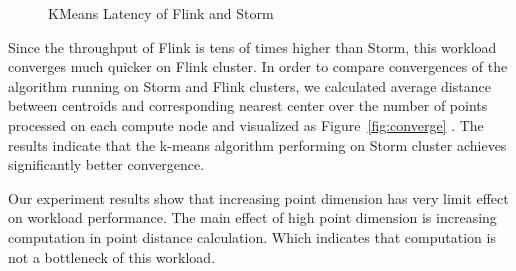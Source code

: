  
\begin{figure}
  \begin{center}
   \caption{KMeans Latency of Flink and Storm}
   \label{fig:kmeans_latency}
  \end{center}
\end{figure}

Since the throughput of Flink is tens of times higher than Storm, this workload converges much quicker on Flink cluster. In order to compare convergences of the algorithm running on Storm and Flink clusters, we calculated average distance between centroids and corresponding nearest center over the number of points processed on each compute node and visualized as Figure~\ref{fig:converge} . The results indicate that the k-means algorithm performing on Storm cluster achieves significantly better convergence.


Our experiment results show that increasing point dimension has very limit effect on workload performance. The main effect of high point dimension is increasing computation in point distance calculation. Which indicates that computation is not a bottleneck of this workload. 

